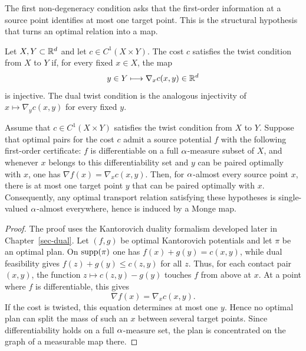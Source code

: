The first non-degeneracy condition asks that the first-order information at a source point identifies at most one target point. This is the structural hypothesis that turns an optimal relation into a map.

\begin{defn}\label{def-twist-condition}
	Let $X,Y\subset\mathbb{R}^d$ and let $c\in C^1(X\times Y)$. The cost $c$ satisfies the twist condition from $X$ to $Y$ if, for every fixed $x\in X$, the map
	\[
		y\in Y \longmapsto \nabla_x c(x,y)\in\mathbb{R}^d
	\]
	is injective. The dual twist condition is the analogous injectivity of $x\mapsto\nabla_y c(x,y)$ for every fixed $y$.
\end{defn}

\begin{prop}\label{prop-twist-prevents-splitting}
	Assume that $c\in C^1(X\times Y)$ satisfies the twist condition from $X$ to $Y$. Suppose that optimal pairs for the cost $c$ admit a source potential $f$ with the following first-order certificate: $f$ is differentiable on a full $\alpha$-measure subset of $X$, and whenever $x$ belongs to this differentiability set and $y$ can be paired optimally with $x$, one has $\nabla f(x)=\nabla_xc(x,y)$. Then, for $\alpha$-almost every source point $x$, there is at most one target point $y$ that can be paired optimally with $x$. Consequently, any optimal transport relation satisfying these hypotheses is single-valued $\alpha$-almost everywhere, hence is induced by a Monge map.
\end{prop}
\begin{proof}
	The proof uses the Kantorovich duality formalism developed later in Chapter~\ref{sec-dual}. Let $(f,g)$ be optimal Kantorovich potentials and let $\pi$ be an optimal plan. On $\operatorname{supp}(\pi)$ one has $f(x)+g(y)=c(x,y)$, while dual feasibility gives $f(z)+g(y)\leq c(z,y)$ for all $z$. Thus, for each contact pair $(x,y)$, the function $z\mapsto c(z,y)-g(y)$ touches $f$ from above at $x$. At a point where $f$ is differentiable, this gives
	\[
		\nabla f(x)=\nabla_x c(x,y).
	\]
	If the cost is twisted, this equation determines at most one $y$. Hence no optimal plan can split the mass of such an $x$ between several target points. Since differentiability holds on a full $\alpha$-measure set, the plan is concentrated on the graph of a measurable map there.
\end{proof}

